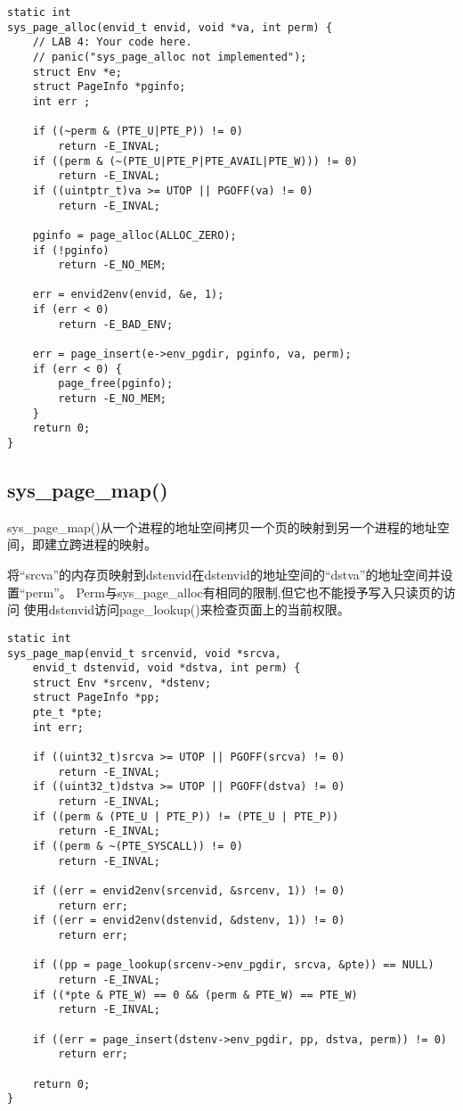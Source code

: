 \documentclass[12pt,a4paper]{article}
\begin{document}
    \begin{lstlisting}[style=CPP]
static int
sys_page_alloc(envid_t envid, void *va, int perm) {
    // LAB 4: Your code here.
    // panic("sys_page_alloc not implemented");
    struct Env *e;
    struct PageInfo *pginfo;
    int err ;

    if ((~perm & (PTE_U|PTE_P)) != 0) 
        return -E_INVAL;
    if ((perm & (~(PTE_U|PTE_P|PTE_AVAIL|PTE_W))) != 0) 
        return -E_INVAL;
    if ((uintptr_t)va >= UTOP || PGOFF(va) != 0) 
        return -E_INVAL; 

    pginfo = page_alloc(ALLOC_ZERO);
    if (!pginfo) 
        return -E_NO_MEM;

    err = envid2env(envid, &e, 1);
    if (err < 0) 
        return -E_BAD_ENV;
        
    err = page_insert(e->env_pgdir, pginfo, va, perm);
    if (err < 0) {
        page_free(pginfo);
        return -E_NO_MEM;
    }
    return 0;
}   
    \end{lstlisting}

    \subsection{sys\_page\_map()}
    sys\_page\_map()从一个进程的地址空间拷贝一个页的映射到另一个进程的地址空间，即建立跨进程的映射。

    将“srcva”的内存页映射到dstenvid在dstenvid的地址空间的“dstva”的地址空间并设置“perm”。
    Perm与sys\_page\_alloc有相同的限制,但它也不能授予写入只读页的访问
    使用dstenvid访问page\_lookup()来检查页面上的当前权限。

    \begin{lstlisting}[style=CPP]
static int
sys_page_map(envid_t srcenvid, void *srcva,
    envid_t dstenvid, void *dstva, int perm) {
    struct Env *srcenv, *dstenv;
    struct PageInfo *pp;
    pte_t *pte;
    int err;

    if ((uint32_t)srcva >= UTOP || PGOFF(srcva) != 0) 
        return -E_INVAL;
    if ((uint32_t)dstva >= UTOP || PGOFF(dstva) != 0) 
        return -E_INVAL;
    if ((perm & (PTE_U | PTE_P)) != (PTE_U | PTE_P)) 
        return -E_INVAL;
    if ((perm & ~(PTE_SYSCALL)) != 0) 
        return -E_INVAL;

    if ((err = envid2env(srcenvid, &srcenv, 1)) != 0) 
        return err;
    if ((err = envid2env(dstenvid, &dstenv, 1)) != 0) 
        return err;

    if ((pp = page_lookup(srcenv->env_pgdir, srcva, &pte)) == NULL) 
        return -E_INVAL;
    if ((*pte & PTE_W) == 0 && (perm & PTE_W) == PTE_W) 
        return -E_INVAL;

    if ((err = page_insert(dstenv->env_pgdir, pp, dstva, perm)) != 0) 
        return err;

    return 0;
}
    \end{lstlisting}
\end{document}
